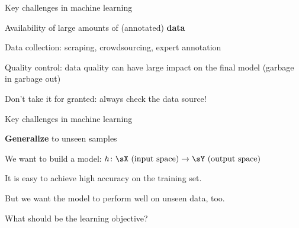 \documentclass[usenames,dvipsnames,notes,11pt,aspectratio=169]{beamer}
\begin{document}
\begin{frame}
    {Key challenges in machine learning}
    \begin{wideitemize}
        \item Availability of large amounts of (annotated) {\bf data}
            \begin{wideitemize}
                \item Data collection: scraping, crowdsourcing, expert annotation
                \item Quality control: data quality can have large impact on the final model (garbage in garbage out)
                \item Don't take it for granted: always check the data source!
            \end{wideitemize}
    \end{wideitemize}
    \medskip\pause
\end{frame}

\begin{frame}
    {Key challenges in machine learning}
    \begin{wideitemize}
        \item \textbf{Generalize} to unseen samples
            \begin{wideitemize}
                \item We want to build a model: $h\colon \sX \text{ (input space)} \rightarrow \sY \text{ (output space)}$
                \item It is easy to achieve high accuracy on the training set.
                \item But we want the model to perform well on unseen data, too.
                \item What should be the learning objective? 
            \end{wideitemize}
    \end{wideitemize}
\end{frame}
\end{document}
